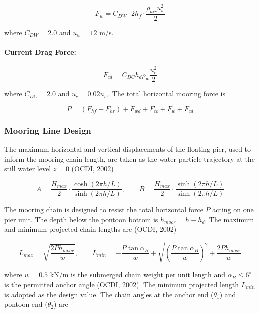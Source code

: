 \documentclass[a4paper, 11pt]{article}
\begin{document}
\begin{equation}
    F_w = C_{DW} \cdot 2h_f \cdot \frac{\rho_{air} u_w^2}{2}
\end{equation}

where $C_{DW} = 2.0$ and $u_w = 12$ m/s.

\paragraph{Current Drag Force:} 

\begin{equation}
    F_{cd} = C_{DC} h_d \rho_w \frac{u_c^2}{2}
\end{equation}

where $C_{DC} = 2.0$ and $u_c = 0.02u_w$. The total horizontal mooring force is

\begin{equation}
    P = (F_{hf} - F_{hr}) + F_{wd} + F_{to} + F_w + F_{cd}
\end{equation}

\subsubsection{Mooring Line Design}

\hspace*{0.5cm} The maximum horizontal and vertical displacements of the floating pier, used to inform the mooring chain length, are taken as the water particle trajectory at the still water level $z = 0$ (OCDI, 2002)

\begin{equation}
    A = \frac{H_{max}}{2}\cdot\frac{\cosh(2\pi h/L)}{\sinh(2\pi h/L)}, \qquad B = \frac{H_{max}}{2}\cdot\frac{\sinh(2\pi h/L)}{\sinh(2\pi h/L)}
\end{equation}

The mooring chain is designed to resist the total horizontal force $P$ acting on one pier unit. The depth below the pontoon bottom is $h_{moor} = h - h_d$. The maximum and minimum projected chain lengths are (OCDI, 2002)

\begin{equation}
    L_{max} = \sqrt{\frac{2Ph_{moor}}{w}}, \qquad L_{min} = -\frac{P\tan\alpha_B}{w} + \sqrt{\left(\frac{P\tan\alpha_B}{w}\right)^2 + \frac{2Ph_{moor}}{w}}
\end{equation}

where $w = 0.5$ kN/m is the submerged chain weight per unit length and $\alpha_B \leq 6^{\circ}$ is the permitted anchor angle (OCDI, 2002). The minimum projected length $L_{min}$ is adopted as the design value. The chain angles at the anchor end ($\theta_1$) and pontoon end ($\theta_2$) are
\end{document}
